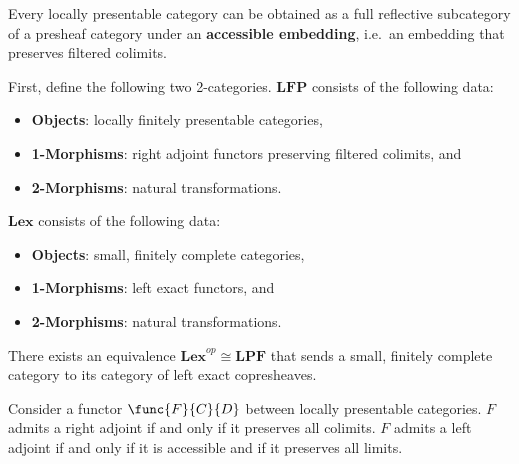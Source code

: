     \begin{property}
        Every locally presentable category can be obtained as a full reflective subcategory of a presheaf category under an \textbf{accessible embedding}, i.e.~an embedding that preserves filtered colimits.
    \end{property}
    \begin{property}
        First, define the following two 2-categories. $\mathbf{LFP}$ consists of the following data:
        \begin{itemize}
            \item\textbf{Objects}: locally finitely presentable categories,
            \item\textbf{1-Morphisms}: right adjoint functors preserving filtered colimits, and
            \item\textbf{2-Morphisms}: natural transformations.
        \end{itemize}
        $\mathbf{Lex}$ consists of the following data:
        \begin{itemize}
            \item\textbf{Objects}: small, finitely complete categories,
            \item\textbf{1-Morphisms}: left exact functors, and
            \item\textbf{2-Morphisms}: natural transformations.
        \end{itemize}
        There exists an equivalence $\mathbf{Lex}^{op}\cong\mathbf{LPF}$ that sends a small, finitely complete category to its category of left exact copresheaves.
    \end{property}

    \begin{theorem}
        Consider a functor $\func{F}{C}{D}$ between locally presentable categories. $F$ admits a right adjoint if and only if it preserves all colimits. $F$ admits a left adjoint if and only if it is accessible and if it preserves all limits.
    \end{theorem}

